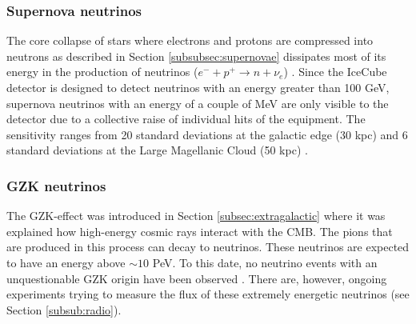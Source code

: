 
\subsubsection{Supernova neutrinos}
The core collapse of stars where electrons and protons are compressed into neutrons as described in Section \ref{subsubsec:supernovae} dissipates most of its energy in the production of neutrinos ($e^- + p^+ \rightarrow n + \nu_e$) \cite{Scholberg:2012id}. Since the IceCube detector is designed to detect neutrinos with an energy greater than 100 GeV, supernova neutrinos with an energy of a couple of MeV are only visible to the detector due to a collective raise of individual hits of the equipment. The sensitivity ranges from 20 standard deviations at the galactic edge (30 kpc) and 6 standard deviations at the Large Magellanic Cloud (50 kpc) \cite{Kopke:2011xb}.

\subsubsection{GZK neutrinos}
The GZK-effect was introduced in Section \ref{subsec:extragalactic} where it was explained how high-energy cosmic rays interact with the CMB. The pions that are produced in this process can decay to neutrinos. These neutrinos are expected to have an energy above $\sim 10$ PeV. To this date, no neutrino events with an unquestionable GZK origin have been observed \cite{Ishihara:2017szg}. There are, however, ongoing experiments trying to measure the flux of these extremely energetic neutrinos (see Section \ref{subsub:radio}).





